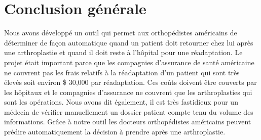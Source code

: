 \documentclass[12pt, french]{report}
\begin{document}
%
%
%



\newpage

\chapter{Conclusion générale} \label{chap:conclusion}

Nous avons développé un outil qui permet aux orthopédistes américains de déterminer de façon automatique quand un patient doit retourner chez lui après une arthroplastie et quand il doit reste à l'hôpital pour une réadaptation. Le projet était important parce que les compagnies d'assurance de santé américaine ne couvrent pas les frais relatifs à la réadaptation d'un patient qui sont très élevés soit environ \$ 30,000 par réadaptation. Ces coûts doivent être couverts par les hôpitaux et le compagnies d'assurance ne couvrent que les arthroplasties qui sont les opérations. Nous avons dit également, il est très fastidieux pour un médecin de vérifier manuellement un dossier patient compte tenu du volume des informations. Grâce à notre outil les docteurs orthopédistes américains peuvent prédire automatiquement la décision à prendre après une arthroplastie.  \\    
\end{document}
